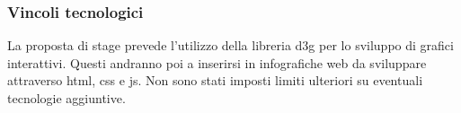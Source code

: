 \subsubsection{Vincoli tecnologici}
La proposta di stage prevede l'utilizzo della libreria \gls{d3g} per lo sviluppo
di grafici interattivi. Questi andranno poi a inserirsi in infografiche web da 
sviluppare attraverso \gls{html}, \gls{css} e \gls{js}.
Non sono stati imposti limiti ulteriori su eventuali tecnologie aggiuntive.